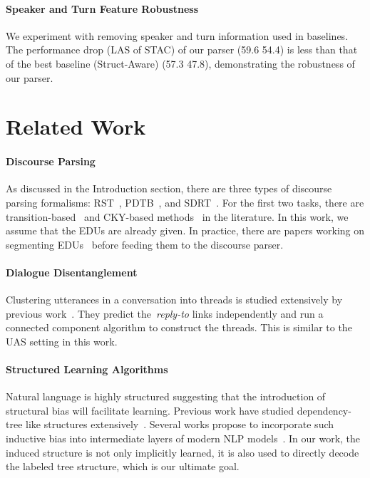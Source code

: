 \documentclass[11pt]{article}
\begin{document}
\paragraph{Speaker and Turn Feature Robustness}
We experiment with removing speaker and turn information used in baselines. The performance drop (LAS of STAC) of our parser (59.6  54.4) is less than that of the best baseline (Struct-Aware) (57.3  47.8), demonstrating the robustness of our parser.


\section{Related Work}
\paragraph{Discourse Parsing}
As discussed in the Introduction section, there are three types of discourse parsing formalisms: RST~\cite{mann1988rhetorical}, PDTB~\cite{prasad2008penn}, and SDRT~\cite{lascarides2008segmented, asher2016discourse}.
For the first two tasks, there are transition-based~\cite{li2014text,braud2017cross,yu2018transition} and CKY-based methods~\cite{joty2015codra,li2016discourse,liu2017learning} in the literature.
In this work, we assume that the EDUs are already given. In practice, there are papers working on segmenting EDUs~\cite{subba2007automatic,li2018segbot} before feeding them to the discourse parser.

\paragraph{Dialogue Disentanglement}
Clustering utterances in a conversation into threads is studied extensively by previous work~\cite{shen2006thread,elsner2008you,wang2009context,elsner2011disentangling,jiang2018learning,kummerfeld2018large,zhu2020did,li2020dialbert,yu2020online}. 
They predict the~\emph{reply-to} links independently and run a connected component algorithm to construct the threads. This is similar to the UAS setting in this work.

\paragraph{Structured Learning Algorithms}
Natural language is highly structured suggesting that the introduction of structural bias will facilitate learning. Previous work have studied dependency-tree like structures extensively~\cite{koo2007structured,mcdonald2005non,mcdonald2007complexity,niculae2018sparsemap,paulus2020gradient}. Several works propose to incorporate such inductive bias into intermediate layers of modern NLP models~\cite{kim2017structured,chen2017improved,liu2018learning,choi2018learning}. In our work, the induced structure is not only implicitly learned, it is also used to directly decode the labeled tree structure, which is our ultimate goal.
\end{document}
